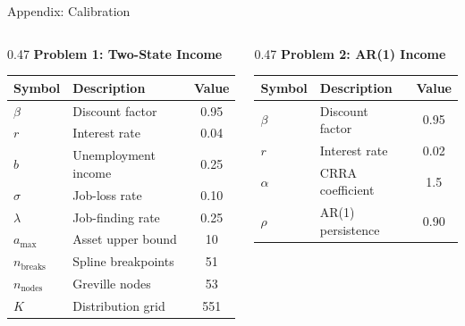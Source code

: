 \documentclass[aspectratio=169,11pt]{beamer}
\begin{document}
\begin{frame}{Appendix: Calibration}
    \footnotesize
    \begin{columns}[T]
        \begin{column}{0.47\textwidth}
            \textbf{Problem 1: Two-State Income}\\[0.3em]
            \renewcommand{\arraystretch}{1.1}
            \begin{tabular}{llc}
                \toprule
                \textbf{Symbol} & \textbf{Description} & \textbf{Value} \\
                \midrule
                $\beta$ & Discount factor & 0.95 \\
                $r$ & Interest rate & 0.04 \\
                $b$ & Unemployment income & 0.25 \\
                $\sigma$ & Job-loss rate & 0.10 \\
                $\lambda$ & Job-finding rate & 0.25 \\
                $a_{\max}$ & Asset upper bound & 10 \\
                $n_{\text{breaks}}$ & Spline breakpoints & 51 \\
                $n_{\text{nodes}}$ & Greville nodes & 53 \\
                $K$ & Distribution grid & 551 \\
                \bottomrule
            \end{tabular}
        \end{column}
        \begin{column}{0.47\textwidth}
            \textbf{Problem 2: AR(1) Income}\\[0.3em]
            \renewcommand{\arraystretch}{1.1}
            \begin{tabular}{llc}
                \toprule
                \textbf{Symbol} & \textbf{Description} & \textbf{Value} \\
                \midrule
                $\beta$ & Discount factor & 0.95 \\
                $r$ & Interest rate & 0.02 \\
                $\alpha$ & CRRA coefficient & 1.5 \\
                $\rho$ & AR(1) persistence & 0.90 \\

\end{tabular}
\end{column}
\end{columns}
\end{frame}
\end{document}
